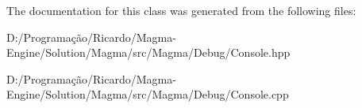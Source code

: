 The documentation for this class was generated from the following files\+:\begin{DoxyCompactItemize}
\item 
D\+:/\+Programação/\+Ricardo/\+Magma-\/\+Engine/\+Solution/\+Magma/src/\+Magma/\+Debug/Console.\+hpp\item 
D\+:/\+Programação/\+Ricardo/\+Magma-\/\+Engine/\+Solution/\+Magma/src/\+Magma/\+Debug/Console.\+cpp\end{DoxyCompactItemize}
